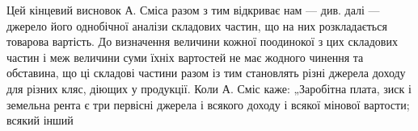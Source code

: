 Цей кінцевий висновок А. Сміса разом з тим відкриває нам — див.
далі — джерело його однобічної аналізи складових частин, що на них
розкладається товарова вартість. До визначення величини кожної поодинокої
з цих складових частин і меж величини суми їхніх вартостей не має
жодного чинення та обставина, що ці складові частини разом із тим
становлять різні джерела доходу для різних кляс, діющих у продукції.
Коли А. Сміс каже: „Заробітна плата, зиск і земельна рента є три первісні
джерела і всякого доходу і всякої мінової вартости; всякий інший
\parbreak{}  %
